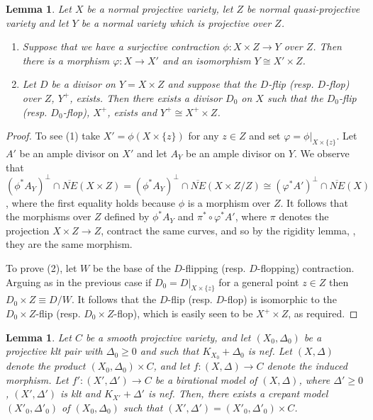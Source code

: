 \documentclass[12pt]{amsart}
\theoremstyle{plain}
\newtheorem{lemma}[theorem]{Lemma}
\theoremstyle{definition}
\def\rar{\rightarrow}
\def\K#1.{K_{#1}}
\begin{document}
\begin{lemma}
\label{lemma_product}
Let $X$ be a normal projective variety,  let $Z$ be normal quasi-projective variety 
and let $Y$ be a normal variety which is projective 
over $Z$.
\begin{enumerate}
\item Suppose that we have a surjective contraction $\phi\colon X\times Z \rightarrow Y$ over $Z$.
Then there is a morphism $\varphi\colon X \rightarrow X'$ and an isomorphism $Y \cong X'\times Z$.

\item Let $D$ be a divisor on $Y=X\times Z$ and suppose that the $D$-flip (resp. $D$-flop) over $Z$, $Y^+$, exists.  
Then there exists a divisor $D_0$ on $X$ such that the $D_0$-flip (resp. $D_0$-flop), $X^+$, exists and
$Y^+ \cong X^+\times Z$.
\end{enumerate}

\end{lemma}
\begin{proof}
To see (1) take $X' = \phi(X \times \{z\})$ for any $z \in Z$ and set $\varphi = \phi\vert_{X\times \{z\}}$. 
Let $A'$ be an ample divisor on $X'$ and
let $A_Y$ be an ample divisor on $Y$.
We observe that $(\phi^*A_Y)^\perp \cap \overline{NE}(X\times Z) 
= (\phi^*A_Y)^\perp \cap \overline{NE}(X\times Z/Z) \cong (\varphi^*A')^\perp \cap \overline{NE}(X)$, 
where the first equality
holds because $\phi$ is a morphism over $Z$.
It follows that the morphisms over $Z$ defined by $\phi^*A_Y$ and $\pi^* \circ \varphi^*A'$,
where $\pi$ denotes the projection $X \times Z \to Z$,
contract the same curves, and so by the rigidity lemma, 
\cite[Lemma 1.15]{MR1841091},
they are the same morphism.



To prove (2), let $W$ be the base of the $D$-flipping (resp. $D$-flopping) contraction.  
Arguing as in the previous case
if $D_0 = D \vert_{X\times \{z\}}$ for a general point $z \in Z$ then 
$D_0 \times Z \equiv D/W$.  It follows that the $D$-flip (resp. $D$-flop)
is isomorphic to the $D_0\times Z$-flip (resp. $D_0\times Z$-flop), which is easily seen to be $X^+\times Z$, as required. 
\end{proof}




\begin{lemma} \label{lemma_crepant_product}
Let $C$ be a smooth projective variety, and let $(X_0,\Delta_0)$ be a projective klt pair with $\Delta_0 \geq 0$ and such that 
$\K X_0. +\Delta_0$ is nef.
Let $(X,\Delta)$ denote the product $(X_0,\Delta_0) \times C$, and let $f \colon (X,\Delta) \rar C$ 
denote the induced morphism.
Let $f' \colon (X',\Delta') \rar C$ be a birational model of $(X,\Delta)$, where $\Delta' \geq 0$, $(X', \Delta')$ is klt and
$K_{X'}+\Delta'$ is nef.
Then, there exists a crepant model $(X'_0,\Delta'_0)$ of $(X_0,\Delta_0)$ such that $(X',\Delta') = (X'_0,\Delta'_0)\times C$.
\end{lemma}
\end{document}
